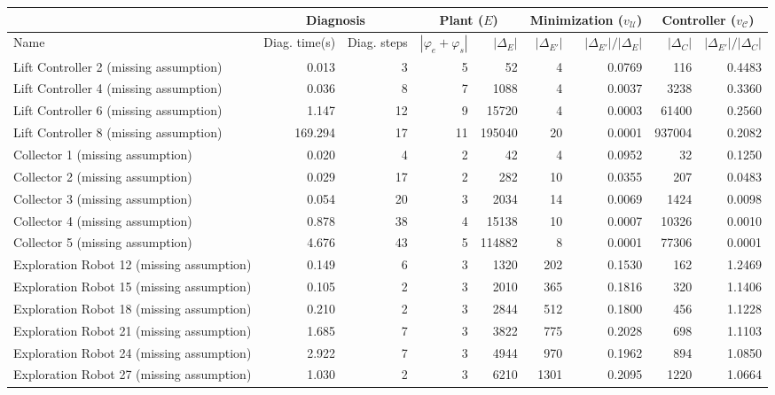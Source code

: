 \begin{tabular}{|l|rr|rr|rr|rr|}
  \hline & \multicolumn{2}{c|}{Diagnosis}&\multicolumn{2}{c|}{Plant ($E$)} & \multicolumn{2}{c|}{Minimization ($v_{\mathcal{U}}$)} & \multicolumn{2}{c|}{Controller ($v_{\mathcal{C}}$)}\\ \hline
Name & Diag. time(s) & Diag. steps & $|\varphi_e + \varphi_s|$ & $|\Delta_E|$ & $|\Delta_{E'}|$ & $|\Delta_{E'}|/|\Delta_{E}|$ & $|\Delta_{C}|$ & $|\Delta_{E'}|/|\Delta_{C}|$ \\ 
  \hline
Lift Controller 2 (missing assumption) & 0.013 & 3 & 5 & 52 & 4 & 0.0769 & 116 & 0.4483 \\ 
  Lift Controller 4 (missing assumption) & 0.036 & 8 & 7 & 1088 & 4 & 0.0037 & 3238 & 0.3360 \\ 
  Lift Controller 6 (missing assumption) & 1.147 & 12 & 9 & 15720 & 4 & 0.0003 & 61400 & 0.2560 \\ 
  Lift Controller 8 (missing assumption) & 169.294 & 17 & 11 & 195040 & 20 & 0.0001 & 937004 & 0.2082 \\ 
  Collector 1 (missing assumption) & 0.020 & 4 & 2 & 42 & 4 & 0.0952 & 32 & 0.1250 \\ 
  Collector 2 (missing assumption) & 0.029 & 17 & 2 & 282 & 10 & 0.0355 & 207 & 0.0483 \\ 
  Collector 3 (missing assumption) & 0.054 & 20 & 3 & 2034 & 14 & 0.0069 & 1424 & 0.0098 \\ 
  Collector 4 (missing assumption) & 0.878 & 38 & 4 & 15138 & 10 & 0.0007 & 10326 & 0.0010 \\ 
  Collector 5 (missing assumption) & 4.676 & 43 & 5 & 114882 & 8 & 0.0001 & 77306 & 0.0001 \\ 
  Exploration Robot 12 (missing assumption) & 0.149 & 6 & 3 & 1320 & 202 & 0.1530 & 162 & 1.2469 \\ 
  Exploration Robot 15 (missing assumption) & 0.105 & 2 & 3 & 2010 & 365 & 0.1816 & 320 & 1.1406 \\ 
  Exploration Robot 18 (missing assumption) & 0.210 & 2 & 3 & 2844 & 512 & 0.1800 & 456 & 1.1228 \\ 
  Exploration Robot 21 (missing assumption) & 1.685 & 7 & 3 & 3822 & 775 & 0.2028 & 698 & 1.1103 \\ 
  Exploration Robot 24 (missing assumption) & 2.922 & 7 & 3 & 4944 & 970 & 0.1962 & 894 & 1.0850 \\ 
  Exploration Robot 27 (missing assumption) & 1.030 & 2 & 3 & 6210 & 1301 & 0.2095 & 1220 & 1.0664 \\ 

\end{tabular}
